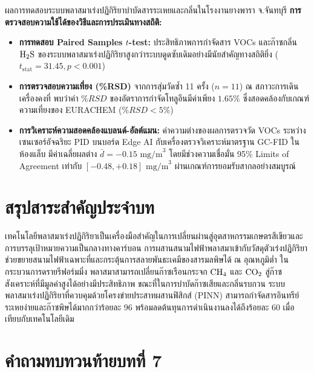 \begin{agribox}{ผลการทดสอบระบบพลาสมาเร่งปฏิกิริยาบำบัดสารระเหยและกลิ่นในโรงงานยางพารา จ.จันทบุรี}
\textbf{การตรวจสอบความใช้ได้ของวิธีและการประเมินทางสถิติ:}
\begin{itemize}
    \item \textbf{การทดสอบ Paired Samples $t$-test:} ประสิทธิภาพการกำจัดสาร VOCs และก๊าซกลิ่น $\ce{H2S}$ ของระบบพลาสมาเร่งปฏิกิริยาสูงกว่าระบบดูดซับเดิมอย่างมีนัยสำคัญทางสถิติยิ่ง ($t_{\text{stat}} = 31.45, p < 0.001$)
    \item \textbf{การตรวจสอบความเที่ยง (\%RSD)} จากการสุ่มวัดซ้ำ 11 ครั้ง ($n = 11$) ณ สภาวะการเดินเครื่องคงที่ พบว่าค่า $\%RSD$ ของอัตราการกำจัดโทลูอีนมีค่าเพียง $1.65\%$ ซึ่งสอดคล้องกับเกณฑ์ความเที่ยงของ EURACHEM ($\%RSD < 5\%$)
    \item \textbf{การวิเคราะห์ความสอดคล้องแบลนด์-อัลต์แมน:} ค่าความต่างของผลการตรวจวัด VOCs ระหว่างเซนเซอร์อัจฉริยะ PID บนบอร์ด Edge AI กับเครื่องตรวจวิเคราะห์มาตรฐาน GC-FID ในห้องแล็บ มีค่าเฉลี่ยผลต่าง $\bar{d} = -0.15 \text{ mg/m}^3$ โดยมีช่วงความเชื่อมั่น 95\% Limits of Agreement เท่ากับ $[-0.48, +0.18] \text{ mg/m}^3$ ผ่านเกณฑ์การยอมรับสากลอย่างสมบูรณ์
\end{itemize}
\end{agribox}

\section{สรุปสาระสำคัญประจำบท}

เทคโนโลยีพลาสมาเร่งปฏิกิริยาเป็นเครื่องมือสำคัญในการเปลี่ยนผ่านสู่อุตสาหกรรมเกษตรสีเขียวและการบรรลุเป้าหมายความเป็นกลางทางคาร์บอน การผสานสนามไฟฟ้าพลาสมาเข้ากับวัสดุตัวเร่งปฏิกิริยาช่วยขยายสนามไฟฟ้าเฉพาะที่และกระตุ้นการสลายพันธะเคมีของสารมลพิษได้ ณ อุณหภูมิต่ำ ในกระบวนการดรายรีฟอร์มมิ่ง พลาสมาสามารถเปลี่ยนก๊าซเรือนกระจก $\ce{CH4}$ และ $\ce{CO2}$ สู่ก๊าซสังเคราะห์ที่มีมูลค่าสูงได้อย่างมีประสิทธิภาพ ขณะที่ในการบำบัดก๊าซเสียและกลิ่นรบกวน ระบบพลาสมาเร่งปฏิกิริยาที่ควบคุมด้วยโครงข่ายประสาทผสานฟิสิกส์ (PINN) สามารถกำจัดสารอินทรีย์ระเหยง่ายและก๊าซพิษได้มากกว่าร้อยละ 96 พร้อมลดต้นทุนการดำเนินงานลงได้ถึงร้อยละ 60 เมื่อเทียบกับเทคโนโลยีเดิม

\section{คำถามทบทวนท้ายบทที่ 7}

